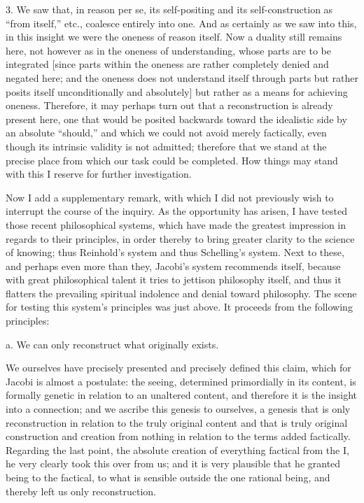 3. We saw that, in reason per se,
its self-positing and its self-construction
as “from itself,” etc., coalesce entirely into one.
And as certainly as we saw into this,
in this insight we were the oneness of reason itself.
Now a duality still remains here,
not however as in the oneness of understanding,
whose parts are to be integrated
[since parts within the oneness are
rather completely denied and negated here;
and the oneness does not understand itself through parts
but rather posits itself unconditionally and absolutely]
but rather as a means for achieving oneness.
Therefore, it may perhaps turn out that
a reconstruction is already present here,
one that would be posited backwards
toward the idealistic side by an absolute “should,”
and which we could not avoid merely factically,
even though its intrinsic validity is not admitted;
therefore that we stand at the precise place
from which our task could be completed.
How things may stand with this
I reserve for further investigation.

Now I add a supplementary remark,
with which I did not previously wish
to interrupt the course of the inquiry.
As the opportunity has arisen,
I have tested those recent philosophical systems,
which have made the greatest impression
in regards to their principles,
in order thereby to bring greater clarity
to the science of knowing;
thus Reinhold's system and thus Schelling's system.
Next to these, and perhaps even more than they,
Jacobi's system recommends itself,
because with great philosophical talent
it tries to jettison philosophy itself,
and thus it flatters the prevailing spiritual
indolence and denial toward philosophy.
The scene for testing this system's principles was just above.
It proceeds from the following principles:

a. We can only reconstruct what originally exists.

We ourselves have precisely presented
and precisely defined this claim,
which for Jacobi is almost a postulate:
the seeing, determined primordially in its content,
is formally genetic in relation to an unaltered content,
and therefore it is the insight into a connection;
and we ascribe this genesis to ourselves,
a genesis that is only reconstruction
in relation to the truly original content
and that is truly original
construction and creation from nothing
in relation to the terms added factically.
Regarding the last point,
the absolute creation of everything factical from the I,
he very clearly took this over from us;
and it is very plausible that he granted being to the factical,
to what is sensible outside the one rational being,
and thereby left us only reconstruction.


